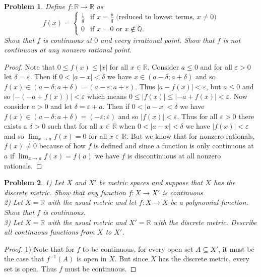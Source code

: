 \documentclass{article}
\newtheorem{problem}{Problem}
\begin{document}
\begin{flushleft}
\begin{problem}
Define $f : \mathbb{R} \rightarrow \mathbb{R}$ as
\[
f(x) =
\begin{cases}
\frac{1}{q} & \text{if $x = \frac{p}{q}$ (reduced to lowest terms, $x \neq 0$)}\\
0 & \text{if $x = 0$ or $x \notin \mathbb{Q}$}.
\end{cases}
\]
Show that $f$ is continuous at $0$ and every irrational point. Show that $f$ is not continuous at any nonzero rational point.
\end{problem}
\begin{proof}
Note that $0 \leq f(x) \leq |x|$ for all $x \in \mathbb{R}$. Consider $a \leq 0$ and for all $\varepsilon > 0$ let $\delta = \varepsilon$. Then if $0 < |a-x| < \delta$ we have $x \in (a - \delta ; a + \delta)$ and so $f(x) \in (a - \delta ; a + \delta) = (a - \varepsilon ; a + \varepsilon)$. Thus $|a-f(x)| < \varepsilon$, but $a \leq 0$ and so $|-(-a+f(x))| < \varepsilon$ which means $0 \leq |f(x)| \leq |-a+f(x)| < \varepsilon$. Now consider $a > 0$ and let $\delta = \varepsilon + a$. Then if $0 < |a-x| < \delta$ we have $f(x) \in (a - \delta ; a + \delta) = (- \varepsilon ; \varepsilon)$ and so $|f(x)| < \varepsilon$. Thus for all $\varepsilon > 0$ there exists a $\delta> 0$ such that for all $x \in \mathbb{R}$ when $0 < |a-x| < \delta$ we have $|f(x)| < \varepsilon$ and so $\lim_{x \rightarrow a} f(x) = 0$ for all $x \in \mathbb{R}$. But we know that for nonzero rationals, $f(x) \neq 0$ because of how $f$ is defined and since a function is only continuous at $a$ if $\lim_{x \rightarrow a} f(x) =f(a)$ we have $f$ is discontinuous at all nonzero rationals.
\end{proof}

\begin{problem}
1) Let $X$ and $X'$ be metric spaces and suppose that $X$ has the discrete metric. Show that any function $f : X \rightarrow X'$ is continuous.\\
2) Let $X = \mathbb{R}$ with the usual metric and let $f : X \rightarrow X$ be a polynomial function. Show that $f$ is continuous.\\
3) Let $X = \mathbb{R}$ with the usual metric and $X' = \mathbb{R}$ with the discrete metric. Describe all continuous functions from $X$ to $X'$.
\end{problem}
\begin{proof}
1) Note that for $f$ to be continuous, for every open set $A \subseteq X'$, it must be the case that $f^{-1}(A)$ is open in $X$. But since $X$ has the discrete metric, every set is open. Thus $f$ must be continuous.\newline


\end{proof}
\end{flushleft}
\end{document}
